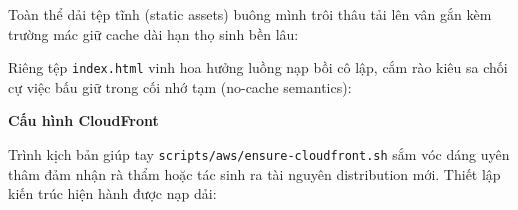 Toàn thể dải tệp tĩnh (static assets) buông mình trôi thâu tải lên vân
gắn kèm trường mác giữ cache dài hạn thọ sinh bền lâu:

\begin{Shaded}
\begin{Highlighting}[]
\OperatorTok{\textless{}}\OperatorTok{\textgreater{}} \DataTypeTok{\textbackslash{}}
   \DataTypeTok{\textbackslash{}}
  \DataTypeTok{\textbackslash{}}
\end{Highlighting}
\end{Shaded}

Riêng tệp \texttt{index.\allowbreak{}html} vinh hoa hưởng luồng nạp bồi cô lập, cắm
rào kiêu sa chối cự việc bấu giữ trong cối nhớ tạm (no-cache semantics):

\begin{Shaded}
\begin{Highlighting}[]
\OperatorTok{\textless{}}\OperatorTok{\textgreater{}}\DataTypeTok{\textbackslash{}}
  \DataTypeTok{\textbackslash{}}
\end{Highlighting}
\end{Shaded}

\vspace{0.5em}\noindent\textbf{Cấu hình CloudFront}\par

Trình kịch bản giúp tay \texttt{scripts/\allowbreak{}aws/\allowbreak{}ensure-\allowbreak{}cloudfront.\allowbreak{}sh} sắm
vóc dáng uyên thâm đảm nhận rà thẩm hoặc tác sinh ra tài nguyên
distribution mới. Thiết lập kiến trúc hiện hành được nạp dải:

